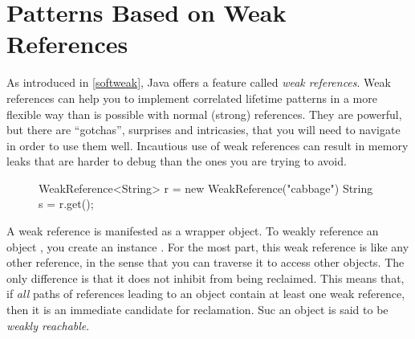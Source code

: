\section{Patterns Based on Weak References}
\label{sec:weak-references}


As introduced in \autoref{softweak}, Java offers a feature called \emph{weak
references}. Weak references can help you to implement correlated lifetime
patterns in a more flexible way than is possible with normal (strong)
references. They are powerful, but there are ``gotchas'', surprises and
intricasies, that you will need to navigate in order to use them well.
Incautious use of weak references can result in memory leaks that are harder to
debug than the ones you are trying to avoid.


\begin{figure}
\centering
\begin{framedlisting}
WeakReference<String> r = new WeakReference("cabbage")
String s = r.get();
\end{framedlisting}
\end{figure}
A weak reference is manifested as a wrapper object. To weakly reference an
object , you create an instance . For the
most part, this weak reference is like any other reference, in the sense that
you can traverse it to access other objects. The only difference is that it does
not inhibit  from being reclaimed.
This means that, if \emph{all} paths of references leading to an object contain
at least one weak reference, then
it is an immediate candidate for reclamation. Suc an object is said
to be \emph{weakly reachable}.

